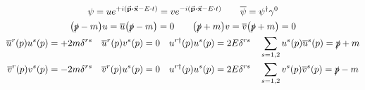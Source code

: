 \begin{gather*}
        \psi
        = ue^{+i\qty(\va{p}\vdot\va{x} - E\cdot t)}
        = ve^{-i\qty(\va{p}\vdot\va{x} - E\cdot t)}
        \qquad
        \overline{\psi} = \psi^\dagger\gamma^0
        \\
        \qty(\slashed{p}-m)u
        = \overline{u}\qty(\slashed{p}-m)
        = 0
        \qquad
        \qty(\slashed{p}+m)v
        = \overline{v}\qty(\slashed{p}+m)
        = 0
        \\
        \overline{u}^r(p)u^s(p) = +2m\delta^{rs}
        \quad
        \overline{u}^r(p)v^s(p) = 0
        \quad
        u^{r\dagger}(p)u^s(p) = 2E\delta^{rs}
        \quad
        \sum_{s=1,2}u^s(p)\overline{u}^s(p) = \slashed{p} + m
        \\
        \overline{v}^r(p)v^s(p) = -2m\delta^{rs}
        \quad
        \overline{v}^r(p)u^s(p) = 0
        \quad
        u^{r\dagger}(p)u^s(p) = 2E\delta^{rs}
        \quad
        \sum_{s=1,2}v^s(p)\overline{v}^s(p) = \slashed{p} - m
\end{gather*}
